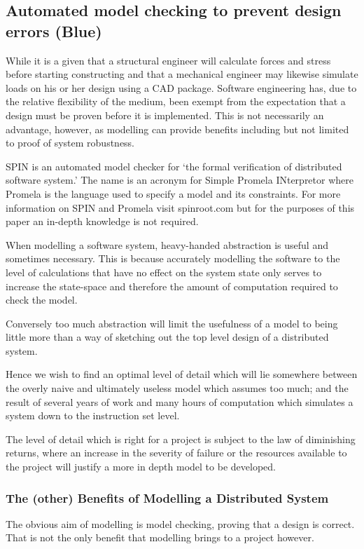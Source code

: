 \subsection{Automated model checking to prevent design errors (Blue)}
While it is a given that a structural engineer will calculate forces and stress before
starting constructing and that a mechanical engineer may likewise simulate loads
on his or her design using a CAD package. Software engineering has,
due to the relative flexibility of the medium, been exempt from the expectation
 that a design must be proven before it is implemented. This is not 
 necessarily an advantage, however, as modelling can provide benefits
 including but not limited to proof of system robustness.

SPIN is an automated model checker for `the formal verification of
distributed software system.'\cite{spinroot} The name is an acronym for
Simple Promela INterpretor where Promela is the language used to 
specify a model and its constraints. For more information on SPIN and
Promela visit spinroot.com but for the purposes of this paper an in-depth
knowledge is not required.

When modelling a software system, heavy-handed abstraction is useful
and sometimes necessary. This is because accurately modelling the software
to the level of calculations that have no effect on the system state only 
serves to increase the state-space and therefore the amount of computation
required to check the model. 

Conversely too much abstraction will limit the usefulness of a model to 
being little more than a way of sketching out the top level design of a 
distributed system.

Hence we wish to find an optimal level of detail  which will lie somewhere between the overly 
naive and ultimately useless model which assumes too much; and the result
of several years of work and many hours of computation which simulates
a system down to the instruction set level. 

The level of detail which is right for a project is subject to the law of diminishing
returns, where an increase in the severity of failure or the resources available to
the project will justify a more in depth model to be developed.

\subsubsection{The (other) Benefits of Modelling a Distributed System}
The obvious aim of modelling is model checking, proving that a design is
correct. That is not the only benefit that modelling brings to a project
however. 


